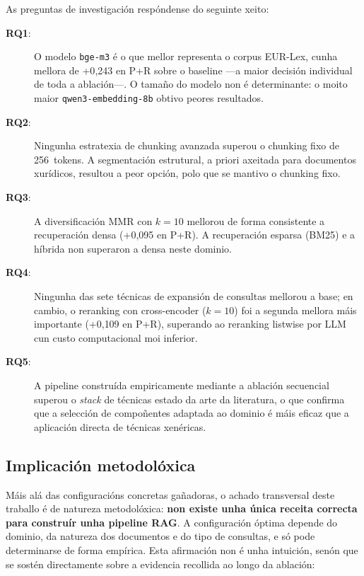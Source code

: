 \documentclass[11pt, a4paper, oneside]{report}
\begin{document}
As preguntas de investigación respóndense do seguinte xeito:

\begin{description}
  \item[\textbf{RQ1}:] O modelo \texttt{bge-m3} é o que mellor representa o corpus
    EUR-Lex, cunha mellora de +0{,}243 en P+R sobre o baseline —a maior decisión
    individual de toda a ablación—. O tamaño do modelo non é determinante: o moito maior
    \texttt{qwen3-embedding-8b} obtivo peores resultados.
  \item[\textbf{RQ2}:] Ningunha estratexia de chunking avanzada superou o chunking fixo
    de 256~tokens. A segmentación estrutural, a priori axeitada para documentos
    xurídicos, resultou a peor opción, polo que se mantivo o chunking fixo.
  \item[\textbf{RQ3}:] A diversificación \ac{MMR} con $k = 10$ mellorou de forma
    consistente a recuperación densa (+0{,}095 en P+R). A recuperación esparsa (BM25) e
    a híbrida non superaron a densa neste dominio.
  \item[\textbf{RQ4}:] Ningunha das sete técnicas de expansión de consultas mellorou a
    base; en cambio, o reranking con cross-encoder ($k = 10$) foi a segunda mellora máis
    importante (+0{,}109 en P+R), superando ao reranking listwise por LLM cun custo
    computacional moi inferior.
  \item[\textbf{RQ5}:] A pipeline construída empiricamente mediante a ablación secuencial
    superou o \textit{stack} de técnicas estado da arte da literatura, o que confirma
    que a selección de compoñentes adaptada ao dominio é máis eficaz que a aplicación
    directa de técnicas xenéricas.
\end{description}

\subsection*{Implicación metodolóxica}

Máis alá das configuracións concretas gañadoras, o achado transversal deste traballo é
de natureza metodolóxica: \textbf{non existe unha única receita correcta para construír
unha pipeline RAG}. A configuración óptima depende do dominio, da natureza dos documentos
e do tipo de consultas, e só pode determinarse de forma empírica. Esta afirmación non é
unha intuición, senón que se sostén directamente sobre a evidencia recollida ao longo da
ablación:
\end{document}

